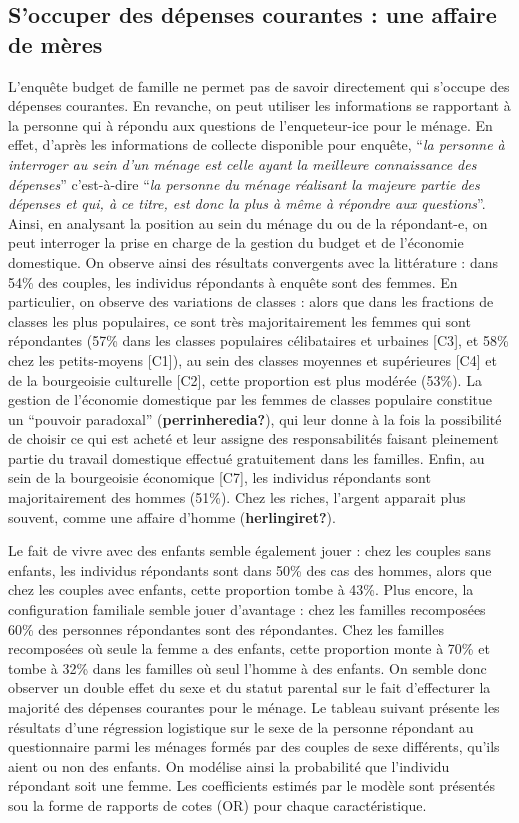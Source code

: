 \documentclass[
  12pt,
]{book}
\begin{document}
\subsection{S'occuper des dépenses courantes : une affaire de
mères}\label{soccuper-des-duxe9penses-courantes-une-affaire-de-muxe8res}

L'enquête budget de famille ne permet pas de savoir directement qui
s'occupe des dépenses courantes. En revanche, on peut utiliser les
informations se rapportant à la personne qui à répondu aux questions de
l'enqueteur-ice pour le ménage. En effet, d'après les informations de
collecte disponible pour enquête, ``\emph{la personne à interroger au
sein d'un ménage est celle ayant la meilleure connaissance des
dépenses}'' c'est-à-dire ``\emph{la personne du ménage réalisant la
majeure partie des dépenses et qui, à ce titre, est donc la plus à même
à répondre aux questions}''. Ainsi, en analysant la position au sein du
ménage du ou de la répondant-e, on peut interroger la prise en charge de
la gestion du budget et de l'économie domestique. On observe ainsi des
résultats convergents avec la littérature : dans 54\% des couples, les
individus répondants à enquête sont des femmes. En particulier, on
observe des variations de classes : alors que dans les fractions de
classes les plus populaires, ce sont très majoritairement les femmes qui
sont répondantes (57\% dans les classes populaires célibataires et
urbaines {[}C3{]}, et 58\% chez les petits-moyens {[}C1{]}), au sein des
classes moyennes et supérieures {[}C4{]} et de la bourgeoisie culturelle
{[}C2{]}, cette proportion est plus modérée (53\%). La gestion de
l'économie domestique par les femmes de classes populaire constitue un
``pouvoir paradoxal'' (\textbf{perrinheredia?}), qui leur donne à la
fois la possibilité de choisir ce qui est acheté et leur assigne des
responsabilités faisant pleinement partie du travail domestique effectué
gratuitement dans les familles. Enfin, au sein de la bourgeoisie
économique {[}C7{]}, les individus répondants sont majoritairement des
hommes (51\%). Chez les riches, l'argent apparait plus souvent, comme
une affaire d'homme (\textbf{herlingiret?}).

Le fait de vivre avec des enfants semble également jouer : chez les
couples sans enfants, les individus répondants sont dans 50\% des cas
des hommes, alors que chez les couples avec enfants, cette proportion
tombe à 43\%. Plus encore, la configuration familiale semble jouer
d'avantage : chez les familles recomposées 60\% des personnes
répondantes sont des répondantes. Chez les familles recomposées où seule
la femme a des enfants, cette proportion monte à 70\% et tombe à 32\%
dans les familles où seul l'homme à des enfants. On semble donc observer
un double effet du sexe et du statut parental sur le fait d'effecturer
la majorité des dépenses courantes pour le ménage. Le tableau suivant
présente les résultats d'une régression logistique sur le sexe de la
personne répondant au questionnaire parmi les ménages formés par des
couples de sexe différents, qu'ils aient ou non des enfants. On modélise
ainsi la probabilité que l'individu répondant soit une femme. Les
coefficients estimés par le modèle sont présentés sou la forme de
rapports de cotes (OR) pour chaque caractéristique.
\end{document}
